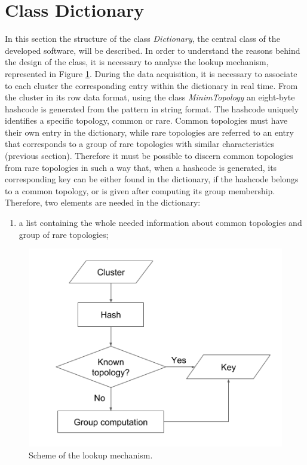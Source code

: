 \section{Class Dictionary}
\label{sec:dic}
In this section the structure of the class \textit{Dictionary}, the central class of the developed software, will be described. In order to understand the reasons behind the design of the class, it is necessary to analyse the lookup mechanism, represented in Figure \ref{fig:lucap}. During the data acquisition, it is necessary to associate to each cluster the corresponding entry within the dictionary in real time. From the cluster in its row data format, using the class \textit{MinimTopology} an eight-byte hashcode is generated from the pattern in string format. The hashcode uniquely identifies a specific topology, common or rare.
Common topologies must have their own entry in the dictionary, while rare topologies are referred to an entry that corresponds to a group of rare topologies with similar characteristics (previous section).
Therefore it must be possible to discern common topologies from rare topologies in such a way that, when a hashcode is generated, its corresponding key can be either found in the dictionary, if the hashcode belongs to a common topology, or is given after computing its group membership. Therefore, two elements are needed in the dictionary:
\begin{enumerate}
 \item a list containing the whole needed information about common topologies and group of rare topologies;
\end{enumerate}
%
\begin{figure}
  \centering
  \includegraphics[scale=0.6]{figures/lucap.png}
  \caption{Scheme of the lookup mechanism.}
  \label{fig:lucap}
\end{figure}
%

